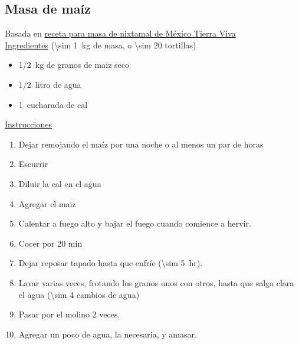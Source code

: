 \subsection{Masa de maíz}
\label{receta:masa-maiz}

Basada en \href{https://mexicotierraviva.org/con-maiz-masa-de-nixtamal/}{receta para masa de nixtamal de México Tierra Viva}\\

\underline{Ingredientes} (\SI{\sim 1}{kg} de masa, o \num{\sim 20} tortillas)
\begin{itemize}
\item \SI{1/2}{kg} de granos de maiz seco
\item \SI{1/2}{litro} de agua
\item \SI{1}{cucharada} de cal
\end{itemize}

\underline{Instrucciones}
\begin{enumerate}
\item Dejar remojando el maíz por una noche o al menos un par de horas
\item Escurrir
\item Diluir la cal en el agua
\item Agregar el maiz
\item Calentar a fuego alto y bajar el fuego cuando comience a hervir.
\item Cocer por 20 min
\item Dejar reposar tapado hasta que enfríe (\SI{\sim 5}{hr}).
\item Lavar varias veces, frotando los granos unos con otros, hasta que salga clara el agua (\num{\sim 4} cambios de agua)
\item Pasar por el molino 2 veces.
\item Agregar un poco de agua, la necesaria, y amasar.
\end{enumerate}


